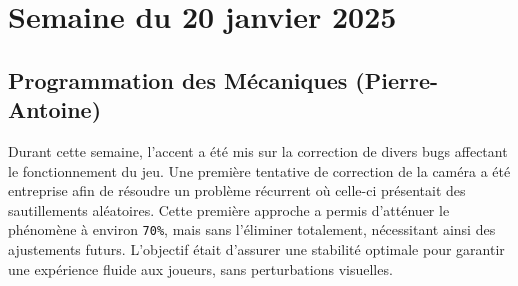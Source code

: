 \documentclass{report}
\begin{document}
\newpage
\section{Semaine du 20 janvier 2025}

\subsection*{Programmation des Mécaniques (Pierre-Antoine)}
Durant cette semaine, l’accent a été mis sur la correction de divers bugs affectant le fonctionnement du jeu. Une première tentative de correction de la caméra a été entreprise afin de résoudre un problème récurrent où celle-ci présentait des sautillements aléatoires. Cette première approche a permis d’atténuer le phénomène à environ \texttt{70\%}, mais sans l’éliminer totalement, nécessitant ainsi des ajustements futurs. L’objectif était d’assurer une stabilité optimale pour garantir une expérience fluide aux joueurs, sans perturbations visuelles.
\end{document}
